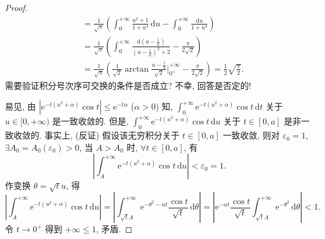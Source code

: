 \begin{proof}
\[\begin{aligned}
    &=\frac{1}{\sqrt{\pi}}\left(\int_{0}^{+\infty}\frac{u^{2}+1}{1+u^{4}}\,\mathrm{d}u-\int_{0}^{+\infty}\frac{\mathrm{d}u}{1+u^{4}}\right)\\
    &=\frac{1}{\sqrt{\pi}}\left(\int_{0}^{+\infty}\frac{\mathrm{d}\left(u-\frac{1}{u}\right)}{\left(u-\frac{1}{u}\right)^{2}+2}-\frac{\pi}{2\sqrt{2}}\right)\\
    &=\frac{1}{\sqrt{\pi}}\left(\frac{1}{\sqrt{2}}\arctan\frac{u-\frac{1}{u}}{\sqrt{2}}\Bigg|_{0^{+}}^{+\infty}-\frac{\pi}{2\sqrt{2}}\right)=\frac{1}{2}\sqrt{\frac{\pi}{2}}.
  \end{aligned}
\]
需要验证积分号次序可交换的条件是否成立? 不幸, 回答是否定的!

易见, 由 $|\mathrm{e}^{-t(u^{2}+\alpha)}\cos t|\leqslant\mathrm{e}^{-t\alpha}$ ($\alpha>0$) 知, $\displaystyle\int_{0}^{+\infty}\mathrm{e}^{-t(u^{2}+\alpha)}\cos t\,\mathrm{d}t$ 关于 $u\in[0,+\infty)$ 是一致收敛的. 但是, $\displaystyle\int_{0}^{+\infty}\mathrm{e}^{-t(u^{2}+\alpha)}\cos t\,\mathrm{d}u$ 关于 $t\in[0,a]$ 是非一致收敛的. 事实上, (反证) 假设该无穷积分关于 $t\in[0,a]$ 一致收敛, 则对 $\varepsilon_{0}=1$, $\exists A_{0}=A_{0}(\varepsilon_{0})>0$, 当 $A>A_{0}$ 时, $\forall t\in[0,a]$, 有
\[
  \left|\int_{A}^{+\infty}\mathrm{e}^{-t(u^{2}+\alpha)}\cos t\,\mathrm{d}u\right|<\varepsilon_{0}=1.
\]
作变换 $\theta=\sqrt{t}u$, 得
\[
  \left|\int_{A}^{+\infty}\mathrm{e}^{-t(u^{2}+\alpha)}\cos t\,\mathrm{d}u\right|=\left|\int_{\sqrt{t}A}^{+\infty}\mathrm{e}^{-\theta^{2}-\alpha t}\frac{\cos t}{\sqrt{t}}\,\mathrm{d}\theta\right|=\left|\mathrm{e}^{-\alpha t}\frac{\cos t}{\sqrt{t}}\int_{\sqrt{t}A}^{+\infty}\mathrm{e}^{-\theta^{2}}\,\mathrm{d}\theta\right|<1.
\]
令 $t\to0^{+}$ 得到 $+\infty\leqslant1$, 矛盾.


\end{proof}
